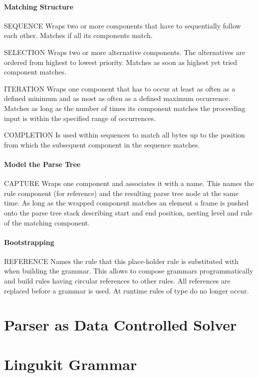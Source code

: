\documentclass[10pt,a4paper]{article}
\begin{document}
\paragraph{Matching Structure}
\begin{rulelist}
\item[SEQUENCE] Wraps two or more components that have to sequentially follow each other. Matches if all its components match.

\item[SELECTION] Wraps two or more alternative components. The alternatives are ordered from highest to lowest priority. Matches as soon as highest yet tried component matches.

\item[ITERATION] Wraps one component that has to occur at least as often as a defined minimum and as most as often as a defined maximum occurrence. Matches as long as the number of times its component matches the proceeding input is within the specified range of occurrences.

\item[COMPLETION] Is used within sequences to match all bytes up to the position from which the subsequent component in the sequence matches.
\end{rulelist}

\paragraph{Model the Parse Tree}
\begin{rulelist}
\item[CAPTURE] Wraps one component and associates it with a name. This names the rule component (for reference) and the resulting parse tree node at the same time. As long as the wrapped component matches an element a frame is pushed onto the parse tree stack describing start and end position, nesting level and rule of the matching component.
\end{rulelist}

\paragraph{Bootstrapping}
\begin{rulelist}
\item[REFERENCE] Names the rule that this place-holder rule is substituted with when building the grammar. This allows to compose grammars programmatically and build rules having circular references to other rules. All references are replaced before a grammar is used. At runtime rules of type do no longer occur.
\end{rulelist}

\section{Parser as Data Controlled Solver}

\section{Lingukit Grammar}
\end{document}
